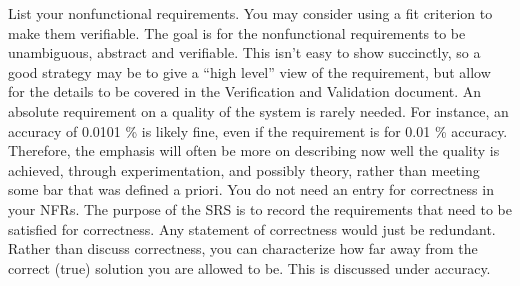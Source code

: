 \documentclass[12pt]{article}
\begin{document}
List your nonfunctional requirements.  You may consider using a fit criterion to
make them verifiable. The goal is for the nonfunctional requirements to be
unambiguous, abstract and verifiable.  This isn't easy to show succinctly, so a
good strategy may be to give a ``high level'' view of the requirement, but allow
for the details to be covered in the Verification and Validation document. An
absolute requirement on a quality of the system is rarely needed.  For instance,
an accuracy of 0.0101 \% is likely fine, even if the requirement is for 0.01 \%
accuracy.  Therefore, the emphasis will often be more on describing now well the
quality is achieved, through experimentation, and possibly theory, rather than
meeting some bar that was defined a priori. You do not need an entry for
correctness in your NFRs.  The purpose of the SRS is to record the requirements
that need to be satisfied for correctness. Any statement of correctness would
just be redundant. Rather than discuss correctness, you can characterize how far
away from the correct (true) solution you are allowed to be.  This is discussed
under accuracy.
\end{document}
